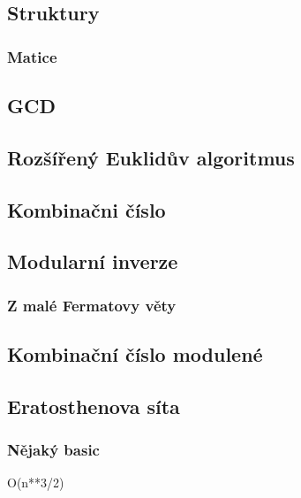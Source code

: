 \documentclass[10pt, a4paper]{article}
\begin{document}
\subsection{Struktury}
\subsubsection{Matice}


\subsection{GCD}


\subsection{Rozšířený Euklidův algoritmus}


\subsection{Kombinačni číslo}


\subsection{Modularní inverze}


\subsubsection{Z malé Fermatovy věty}


\subsection{Kombinační číslo modulené}


\subsection{Eratosthenova síta}
\subsubsection{Nějaký basic}
O(n**3/2)

\end{document}
